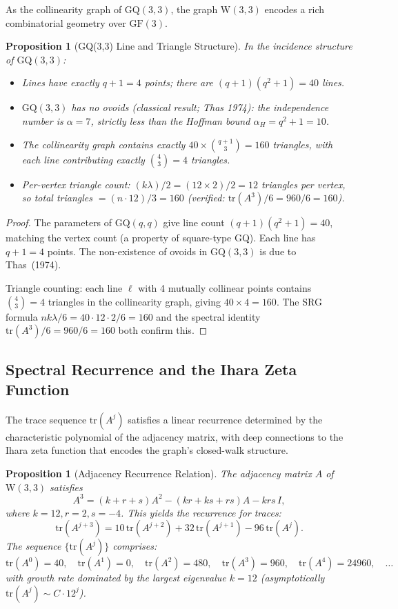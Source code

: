\documentclass[12pt,a4paper]{article}
\newtheorem{proposition}[theorem]{Proposition}
\newcommand{\W}{\mathrm{W}(3,3)}
\newcommand{\GF}{\mathrm{GF}}
\begin{document}
As the collinearity graph of $\mathrm{GQ}(3,3)$, the graph $\W$ encodes
a rich combinatorial geometry over $\GF(3)$.

\begin{proposition}[GQ(3,3) Line and Triangle Structure]
\label{prop:gqgeometry}
In the incidence structure of $\mathrm{GQ}(3,3)$:
\begin{itemize}
  \item Lines have exactly $q+1=4$ points; there are $(q+1)(q^2+1)=40$ lines.
  \item $\mathrm{GQ}(3,3)$ has \emph{no ovoids} (classical result; Thas 1974):
        the independence number is $\alpha = 7$, strictly less than the
        Hoffman bound $\alpha_H = q^2+1 = 10$.
  \item The collinearity graph contains exactly $40 \times \binom{q+1}{3} = 160$
        triangles, with each line contributing exactly $\binom{4}{3}=4$ triangles.
  \item Per-vertex triangle count: $(k\lambda)/2 = (12 \times 2)/2 = 12$ triangles per vertex,
        so total triangles $= (n \cdot 12)/3 = 160$ (\emph{verified}: $\mathrm{tr}(A^3)/6 = 960/6 = 160$).
\end{itemize}
\end{proposition}

\begin{proof}
The parameters of $\mathrm{GQ}(q,q)$ give line count $(q+1)(q^2+1)=40$,
matching the vertex count (a property of square-type GQ). Each line has $q+1=4$ points.
The non-existence of ovoids in $\mathrm{GQ}(3,3)$ is due to Thas~(1974).

Triangle counting: each line $\ell$ with 4 mutually collinear points contains $\binom{4}{3}=4$
triangles in the collinearity graph, giving $40\times 4 = 160$.
The SRG formula $n k \lambda/6 = 40\cdot 12\cdot 2/6 = 160$ and the spectral
identity $\mathrm{tr}(A^3)/6 = 960/6 = 160$ both confirm this.
\end{proof}

\subsection{Spectral Recurrence and the Ihara Zeta Function}

The trace sequence $\mathrm{tr}(A^j)$ satisfies a linear recurrence determined
by the characteristic polynomial of the adjacency matrix, with deep connections
to the Ihara zeta function that encodes the graph's closed-walk structure.

\begin{proposition}[Adjacency Recurrence Relation]
\label{prop:recurrence}
The adjacency matrix $A$ of $\W$ satisfies
\[
  A^3 = (k+r+s)A^2 - (kr+ks+rs)A - krs\,I,
\]
where $k=12, r=2, s=-4$. This yields the recurrence for traces:
\[
  \mathrm{tr}(A^{j+3}) = 10\,\mathrm{tr}(A^{j+2}) + 32\,\mathrm{tr}(A^{j+1}) - 96\,\mathrm{tr}(A^j).
\]
The sequence $\{\mathrm{tr}(A^j)\}$ comprises:
\[\mathrm{tr}(A^0)=40,\quad \mathrm{tr}(A^1)=0,\quad \mathrm{tr}(A^2)=480,\quad
  \mathrm{tr}(A^3)=960,\quad \mathrm{tr}(A^4)=24960,\quad \ldots\]
with growth rate dominated by the largest eigenvalue $k=12$ (asymptotically $\mathrm{tr}(A^j) \sim C \cdot 12^j$).
\end{proposition}
\end{document}
